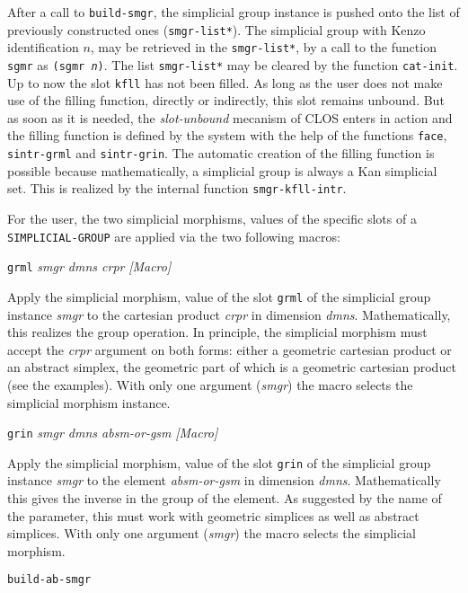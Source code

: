 \vskip 0.30cm
After a call to {\tt build-smgr}, the simplicial group instance 
is pushed onto the list of previously constructed  ones ({\tt *smgr-list*}).
The simplicial group with Kenzo identification $n$, may be retrieved in the {\tt *smgr-list*}, 
by a call to the function {\tt sgmr}
as {\tt (sgmr {\em n})}. The list {\tt *smgr-list*} may be cleared by the function {\tt cat-init}.
\vskip 0.30cm
Up to now the slot {\tt kfll} has not been filled. As long as the user does not make use of the filling
function, directly or indirectly, this slot remains unbound. But as soon as it is needed, the {\em slot-unbound}
mecanism of CLOS enters in action and the filling function is defined by the system with
the help of the functions {\tt face}, {\tt sintr-grml} and {\tt sintr-grin}. The automatic creation
of the filling function is possible because mathematically, a simplicial group is always a Kan simplicial set.
This is realized by the internal function {\tt smgr-kfll-intr}.\par
For the user, the two simplicial morphisms, 
values of the specific slots  of a {\tt SIMPLICIAL-GROUP} are applied via the two following macros:
\vskip 0.30cm
{\parindent=0mm
{\leftskip=5mm
{\tt grml} {\em smgr dmns crpr} \hfill {\em [Macro]} \par}
{\leftskip=15mm
Apply the simplicial morphism, value of the slot {\tt grml} of the simplicial group instance {\em smgr}
to the cartesian product {\em crpr} in dimension {\em dmns}. Mathematically, this realizes the
group operation. In principle, the simplicial morphism must
accept the {\em crpr} argument on both forms: either a geometric cartesian product or an abstract simplex, 
the geometric part of which is a geometric cartesian pro\-duct (see the examples). With only one argument
({\em smgr}) the macro selects the simplicial morphism instance. \par}
{\leftskip=5mm
{\tt grin} {\em smgr dmns absm-or-gsm} \hfill {\em [Macro]} \par}
{\leftskip=15mm
Apply the simplicial morphism, value of the slot {\tt grin} of the simplicial group instance {\em smgr}
to the element {\em absm-or-gsm} in dimension {\em dmns}. Mathematically this gives the inverse
in the group of the e\-le\-ment. As suggested by the name of the parameter, this must work with geometric
simplices as well as abstract simplices. With only one argument
({\em smgr}) the macro selects the simplicial morphism. \par}
}
\newpage
{\tt build-ab-smgr}\par
